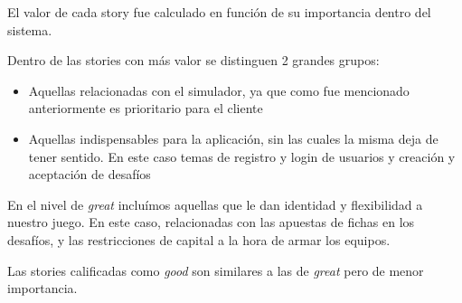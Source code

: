 El valor de cada story fue calculado en función de su importancia dentro del sistema. 

Dentro de las stories con más valor se distinguen 2 grandes grupos:
\begin{itemize}
  \item Aquellas relacionadas con el simulador, ya que como fue mencionado anteriormente es prioritario para el cliente
  \item Aquellas indispensables para la aplicación, sin las cuales la misma deja de tener sentido. En este caso temas de registro y login de usuarios y creación y aceptación
  de desafíos
\end{itemize}

En el nivel de \emph{great} incluímos aquellas que le dan identidad y flexibilidad a nuestro juego. En este caso, relacionadas con las apuestas de fichas en los desafíos,
y las restricciones de capital a la hora de armar los equipos.

Las stories calificadas como \emph{good} son similares a las de \emph{great} pero de menor importancia.

